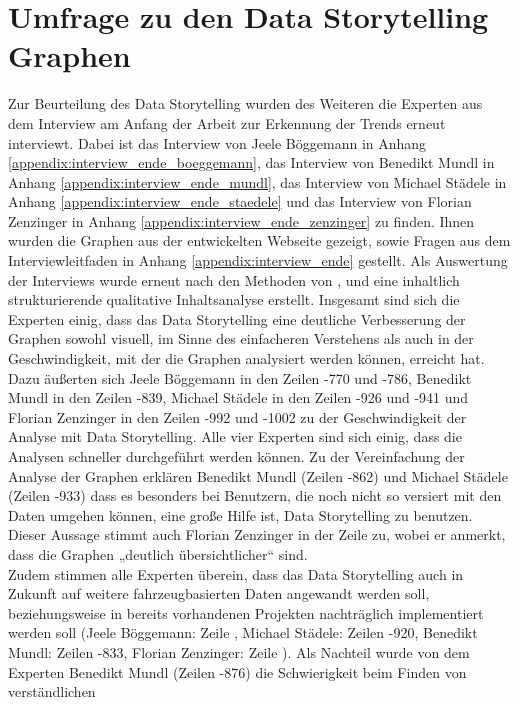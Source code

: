 \section{Umfrage zu den Data Storytelling Graphen}
Zur Beurteilung des Data Storytelling wurden des Weiteren die Experten aus dem Interview am Anfang der Arbeit zur Erkennung der Trends erneut interviewt. Dabei ist das Interview von Jeele Böggemann in Anhang \ref{appendix:interview_ende_boeggemann}, das Interview von Benedikt Mundl in Anhang \ref{appendix:interview_ende_mundl}, das Interview von Michael Städele in Anhang \ref{appendix:interview_ende_staedele} und das Interview von Florian Zenzinger in Anhang \ref{appendix:interview_ende_zenzinger} zu finden. Ihnen wurden die Graphen aus der entwickelten Webseite gezeigt, sowie Fragen aus dem Interviewleitfaden in Anhang \ref{appendix:interview_ende} gestellt. Als Auswertung der Interviews wurde erneut nach den Methoden von \cite{Mayring.2022}, \cite{Kuckartz.2022} und \cite{AndreMorgensternEinenkel.2023} eine inhaltlich strukturierende qualitative Inhaltsanalyse erstellt. Insgesamt sind sich die Experten einig, dass das Data Storytelling eine deutliche Verbesserung der Graphen sowohl visuell, im Sinne des einfacheren Verstehens als auch in der Geschwindigkeit, mit der die Graphen analysiert werden können, erreicht hat. Dazu äußerten sich Jeele Böggemann in den Zeilen -770 und -786, Benedikt Mundl in den Zeilen -839, Michael Städele in den Zeilen -926 und -941 und Florian Zenzinger in den Zeilen -992 und -1002  zu der Geschwindigkeit der Analyse mit Data Storytelling. Alle vier Experten sind sich einig, dass die Analysen schneller durchgeführt werden können. Zu der Vereinfachung der Analyse der Graphen erklären Benedikt Mundl (Zeilen -862) und Michael Städele (Zeilen -933) dass es besonders bei Benutzern, die noch nicht so versiert mit den Daten umgehen können, eine große Hilfe ist, Data Storytelling zu benutzen. Dieser Aussage stimmt auch Florian Zenzinger in der Zeile  zu, wobei er anmerkt, dass die Graphen „deutlich übersichtlicher“ sind.\\ Zudem stimmen alle Experten überein, dass das Data Storytelling auch in Zukunft auf weitere fahrzeugbasierten Daten angewandt werden soll, beziehungsweise in bereits vorhandenen Projekten nachträglich implementiert werden soll (Jeele Böggemann: Zeile , Michael Städele: Zeilen -920, Benedikt Mundl: Zeilen -833, Florian Zenzinger: Zeile ). Als Nachteil wurde von dem Experten Benedikt Mundl (Zeilen -876) die Schwierigkeit beim Finden von verständlichen 